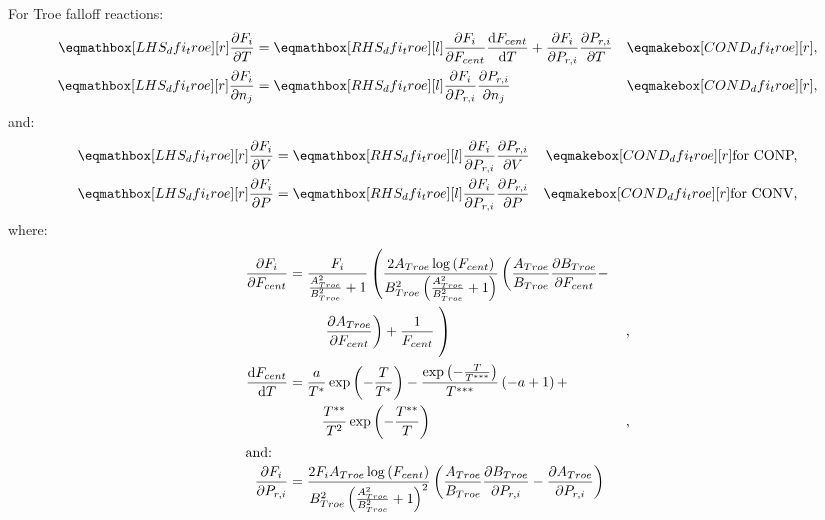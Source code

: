 \documentclass[12pt]{article}
\newcommand{\conp}{CONP}
\newcommand{\conv}{CONV}
\newcommand{\dconp}{\ifmmode\text{for \conp,}\else for \conp,\fi}
\newcommand{\dconv}{\ifmmode\text{for \conv,}\else for \conv,\fi}
\begin{document}
For Troe falloff reactions:
\begin{align}
 \lhs{dfi_troe}{\frac{\partial F_{i} }{\partial T }} &= \rhs{dfi_troe}{\frac{\partial F_{i} }{\partial F_{cent} } \frac{\text{d} F_{cent} }{\text{d} T } + \frac{\partial F_{i} }{\partial P_{r, i} } \frac{\partial P_{r, i} }{\partial T }} & \cond{dfi_troe}{,} \label{e:dfi_troe_dt} \\
 \lhs{dfi_troe}{\frac{\partial F_{i} }{\partial n_j }} &= \rhs{dfi_troe}{\frac{\partial F_{i} }{\partial P_{r, i} } \frac{\partial P_{r, i} }{\partial n_j }} & \cond{dfi_troe}{,} \label{e:dfi_troe_dnj}
\end{align}
and:
\begin{subequations}
 \label{e:dfi_troe_de}
 \begin{align}
 \lhs{dfi_troe}{\frac{\partial F_{i} }{\partial V }} &= \rhs{dfi_troe}{\frac{\partial F_{i} }{\partial P_{r, i} } \frac{\partial P_{r, i} }{\partial V }} & \cond{dfi_troe}{\dconp} \\
 \lhs{dfi_troe}{\frac{\partial F_{i} }{\partial P }} &= \rhs{dfi_troe}{\frac{\partial F_{i} }{\partial P_{r, i} } \frac{\partial P_{r, i} }{\partial P }} & \cond{dfi_troe}{\dconv}
 \end{align}
\end{subequations}
where:
\begin{align}
 \frac{\partial F_{i} }{\partial F_{cent} } &= \frac{F_{i}}{\frac{A_{Troe}^{2}}{B_{Troe}^{2}} + 1} \left(\frac{2 A_{Troe} \log{\left (F_{cent} \right )}}{B_{Troe}^{2} \left(\frac{A_{Troe}^{2}}{B_{Troe}^{2}} + 1\right)} \left(\frac{A_{Troe}}{B_{Troe}} \frac{\partial B_{Troe} }{\partial F_{cent} } - \right. \right. & \nonumber \\
 & \mathindent \left. \frac{\partial A_{Troe} }{\partial F_{cent} }\right) + \frac{1}{F_{cent}} \left. \vphantom{\frac{F_{i}}{\frac{A_{Troe}^{2}}{B_{Troe}^{2}} + 1}} \right) & \text{,} \label{e:dfi_troe_dfcent_partial} \\
\frac{\text{d} F_{cent} }{\text{d} T } &= \frac{a}{T^{*}} \operatorname{exp}\left({- \frac{T}{T^{*}}}\right) - \frac{\operatorname{exp}\left({- \frac{T}{T^{***}}}\right)}{T^{***}} \left(- a + 1\right) + & \nonumber \\
 & \mathindent \frac{T^{**}}{T^{2}} \operatorname{exp}\left({- \frac{T^{**}}{T}}\right) & \text{,} \label{e:dfcent_dt} \\
\intertext{and:}
\frac{\partial F_{i} }{\partial P_{r, i} } &= \frac{2 F_{i} A_{Troe} \log{\left (F_{cent} \right )}}{B_{Troe}^{2} \left(\frac{A_{Troe}^{2}}{B_{Troe}^{2}} + 1\right)^{2}} \left(\frac{A_{Troe}}{B_{Troe}} \frac{\partial B_{Troe} }{\partial P_{r, i} } - \frac{\partial A_{Troe} }{\partial P_{r, i} }\right) \label{e:dfi_troe_dpr_partial}
\end{align}
\end{document}
